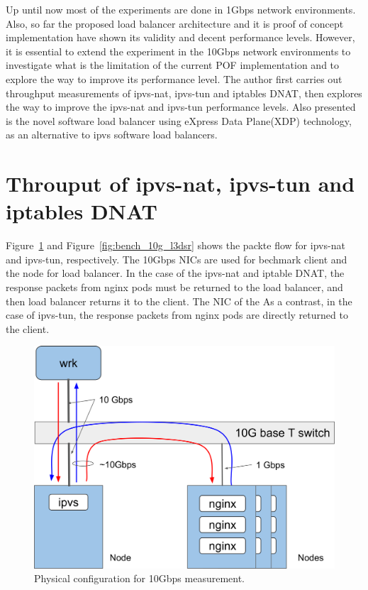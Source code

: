 Up until now most of the experiments are done in 1Gbps network environments.
Also, so far the proposed load balancer architecture and it is proof of concept implementation have shown its validity and decent performance levels.
However, it is essential to extend the experiment in the 10Gbps network environments to investigate what is the limitation of the current POF implementation and to explore the way to improve its performance level.
The author first carries out throughput measurements of ipvs-nat, ipvs-tun and iptables DNAT, then explores the way to improve the ipvs-nat and ipvs-tun performance levels.
Also presented is the novel software load balancer using eXpress Data Plane(XDP) technology, as an alternative to ipvs software load balancers.

\section{Throuput of ipvs-nat, ipvs-tun and iptables DNAT}

Figure~\ref{fig:bench_10g} and Figure~\ref{fig:bench_10g_l3dsr} shows the packte flow for ipvs-nat and ipvs-tun, respectively.
The 10Gbps NICs are used for bechmark client and the node for load balancer.
In the case of the ipvs-nat and iptable DNAT, the response packets from nginx pods must be returned to the load balancer, and then load balancer returns it to the client.
The NIC of the 
As a contrast, in the case of ipvs-tun, the response packets from nginx pods are directly returned to the client.

\begin{figure}[h]
  \centering
  \includegraphics[width=0.8\columnwidth]{Figs/bench_10g}
  \caption{Physical configuration for 10Gbps measurement.}
  \label{fig:bench_10g}
\end{figure}

